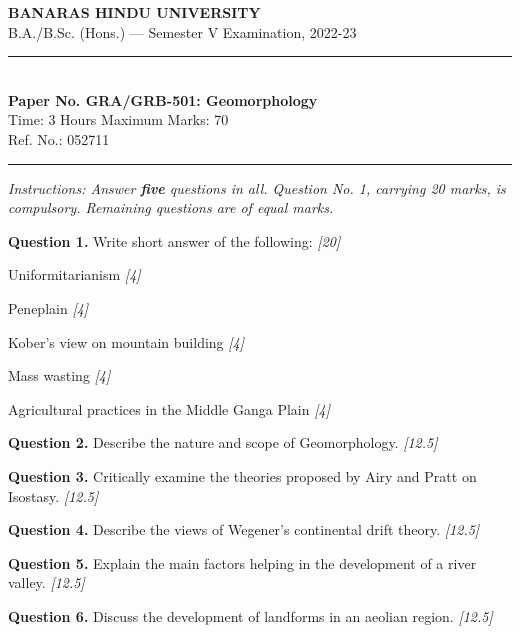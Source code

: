 \documentclass[11pt,a4paper]{article}
\newcommand{\pts}[1]{\hfill   \textit{[#1]}}
\begin{document}
\begin{center}
  {\large\bfseries BANARAS HINDU UNIVERSITY}\\[2pt]
  {\normalsize B.A./B.Sc. (Hons.) --- Semester V Examination, 2022-23}\\[6pt]
  \rule{0.8\linewidth}{0.5pt}\\[6pt]
  {\large\bfseries Paper No. GRA/GRB-501: Geomorphology}\\[4pt]
  {\normalsize Time: 3 Hours \hfill Maximum Marks: 70}\\[2pt]
  {\small Ref. No.: 052711}
\end{center}
\rule{\linewidth}{0.4pt}
\smallskip



\noindent   \textit{Instructions: Answer   \textbf{five} questions in all. Question No. 1, carrying 20 marks, is compulsory. Remaining questions are of equal marks.}
\bigskip




\noindent   \textbf{Question 1.} Write short answer of the following: \pts{20}

\begin{parts}
  \item Uniformitarianism \pts{4}
  \item Peneplain \pts{4}
  \item Kober's view on mountain building \pts{4}
  \item Mass wasting \pts{4}
  \item Agricultural practices in the Middle Ganga Plain \pts{4}
\end{parts}

\medskip


\noindent   \textbf{Question 2.} Describe the nature and scope of Geomorphology. \pts{12.5}

\medskip


\noindent   \textbf{Question 3.} Critically examine the theories proposed by Airy and Pratt on Isostasy. \pts{12.5}

\medskip


\noindent   \textbf{Question 4.} Describe the views of Wegener's continental drift theory. \pts{12.5}

\medskip


\noindent   \textbf{Question 5.} Explain the main factors helping in the development of a river valley. \pts{12.5}

\medskip


\noindent   \textbf{Question 6.} Discuss the development of landforms in an aeolian region. \pts{12.5}
\end{document}
